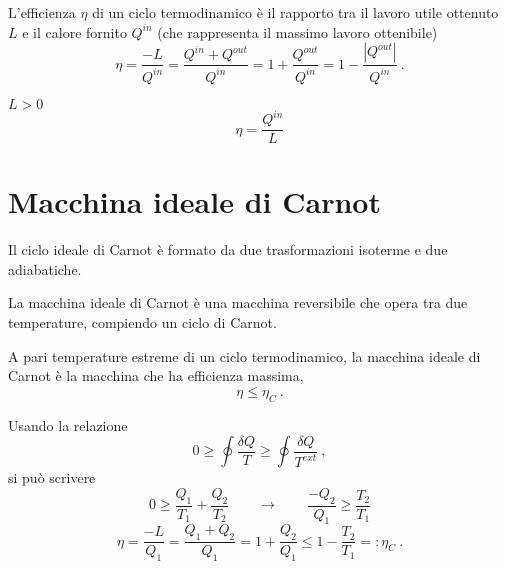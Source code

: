 \begin{definition} L'efficienza $\eta$ di un ciclo termodinamico è il rapporto tra il lavoro utile ottenuto $L$ e il calore fornito $Q^{in}$ (che rappresenta il massimo lavoro ottenibile)
    \begin{equation}
        \eta = \dfrac{-L}{Q^{in}} = \dfrac{Q^{in}+Q^{out}}{Q^{in}} = 1 + \dfrac{Q^{out}}{Q^{in}} =  1 - \dfrac{|Q^{out}|}{Q^{in}} \ .
    \end{equation}
\end{definition}

\begin{definition} $L > 0$
    \begin{equation}
        \eta = \dfrac{Q^{in}}{L}
    \end{equation}
\end{definition}

\section{Macchina ideale di Carnot}
\begin{definition}
    Il ciclo ideale di Carnot è formato da due trasformazioni isoterme e due adiabatiche.
\end{definition}
\begin{definition}
    La macchina ideale di Carnot è una macchina reversibile che opera tra due temperature, compiendo un ciclo di Carnot.
\end{definition}
\begin{definition}
    A pari temperature estreme di un ciclo termodinamico, la macchina ideale di Carnot è la macchina che ha efficienza massima,
    \begin{equation} \eta \le \eta_C \ . \end{equation}
\end{definition}

\noindent
Usando la relazione
\begin{equation}
    0 \ge \oint \dfrac{\delta Q}{T} \ge \oint \dfrac{\delta Q}{T^{ext}} \ ,
\end{equation}
si può scrivere
\begin{equation}
    0 \ge \dfrac{Q_1}{T_1} + \dfrac{Q_2}{T_2} \qquad \rightarrow \qquad \dfrac{-Q_2}{Q_1} \ge \dfrac{T_2}{T_1}
\end{equation}
\begin{equation}
    \eta = \dfrac{-L}{Q_1} = \dfrac{Q_1 + Q_2}{Q_1} = 1 + \dfrac{Q_2}{Q_1} \le 1 - \dfrac{T_2}{T_1} =: \eta_C \ .
\end{equation}

